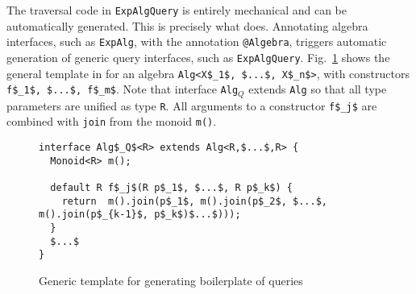 
The traversal code in \lstinline{ExpAlgQuery} is entirely
mechanical and can be automatically generated.  This is precisely what
\name does. Annotating algebra interfaces, such as \lstinline{ExpAlg}, with the annotation \lstinline{@Algebra},
triggers automatic generation of generic query interfaces, such as \lstinline{ExpAlgQuery}.
Fig.~\ref{queryTemplate} shows the general template in \name for an algebra \lstinline[mathescape=true]{Alg<X$_1$, $...$, X$_n$>}, with constructors \lstinline[mathescape=true]{f$_1$, $...$, f$_m$}.
Note that interface \lstinline{Alg}$_Q$ extends \lstinline{Alg} so that all type parameters are unified as type \lstinline{R}.
All arguments to a constructor \lstinline[mathescape=true]{f$_j$} are combined with \lstinline{join} from the monoid \lstinline{m()}.

\begin{figure}[t]
\nocaptionrule
\begin{lstlisting}[mathescape=true]
interface Alg$_Q$<R> extends Alg<R,$...$,R> {
  Monoid<R> m();

  default R f$_j$(R p$_1$, $...$, R p$_k$) {
    return  m().join(p$_1$, m().join(p$_2$, $...$, m().join(p$_{k-1}$, p$_k$)$...$)));
  }
  $...$
}
\end{lstlisting}
\caption{Generic template for generating boilerplate of queries}
\label{queryTemplate}
\end{figure}


